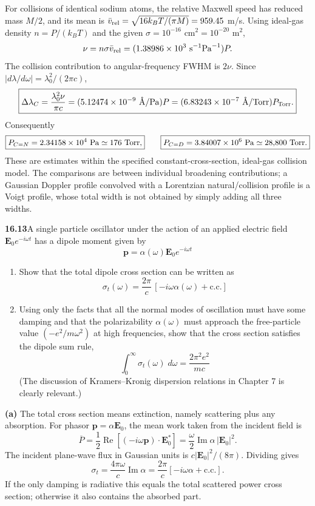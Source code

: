 For collisions of identical sodium atoms, the relative Maxwell speed
has reduced mass $M/2$, and its mean is
$\bar v_{\rm rel}=\sqrt{16k_BT/(\pi M)}=959.45$ m/s.
Using ideal-gas density $n=P/(k_BT)$ and the given
$\sigma=10^{-16}$ cm$^2=10^{-20}$ m$^2$,
\[
\nu=n\sigma\bar v_{\rm rel}
=(1.38986\times10^3\ {\rm s}^{-1}{\rm Pa}^{-1})P.
\]
The collision contribution to angular-frequency FWHM is $2\nu$.
Since $|d\lambda/d\omega|=\lambda_0^2/(2\pi c)$,
\[
\boxed{\Delta\lambda_C=\frac{\lambda_0^2\nu}{\pi c}
=(5.12474\times10^{-9}\ \text{\AA/Pa})P
=(6.83243\times10^{-7}\ \text{\AA/Torr})P_{\rm Torr}.}
\]
Consequently
\[
\boxed{P_{C=N}=2.34158\times10^4\ {\rm Pa}\simeq176\ {\rm Torr},}
\qquad
\boxed{P_{C=D}=3.84007\times10^6\ {\rm Pa}\simeq28{,}800\ {\rm Torr}.}
\]
These are estimates within the specified constant-cross-section,
ideal-gas collision model. The comparisons are between individual
broadening contributions; a Gaussian Doppler profile convolved with
a Lorentzian natural/collision profile is a Voigt profile, whose total
width is not obtained by simply adding all three widths.

\par\bigskip
\noindent\textbf{16.13}\quad A single particle oscillator under the action of an applied electric field $\mathbf{E}_{0}e^{-i\omega t}$ has a dipole moment given by
\[
\mathbf{p}=\alpha(\omega)\mathbf{E}_{0}e^{-i\omega t}
\]
\begin{enumerate}
\item[(a)] Show that the total dipole cross section can be written as
\[
\sigma_{t}(\omega)=\frac{2\pi}{c}\,[-i\omega\alpha(\omega)+\text{c.c.}]
\]
\item[(b)] Using only the facts that all the normal modes of oscillation must have some damping and that the polarizability $\alpha(\omega)$ must approach the free-particle value $(-e^{2}/m\omega^{2})$ at high frequencies, show that the cross section satisfies the dipole sum rule,
\[
\int_{0}^{\infty}\sigma_{t}(\omega)\;d\omega=\frac{2\pi^{2}e^{2}}{mc}
\]
(The discussion of Kramers--Kronig dispersion relations in Chapter 7 is clearly relevant.)
\end{enumerate}
\solution

\textbf{(a)} The total cross section means extinction, namely scattering
plus any absorption. For phasor $\mathbf p=\alpha\mathbf E_0$,
the mean work taken from the incident field is
\[
\overline P=\frac12\operatorname{Re}
[(-i\omega\mathbf p)\cdot\mathbf E_0^*]
=\frac\omega2\operatorname{Im}\alpha\,|\mathbf E_0|^2.
\]
The incident plane-wave flux in Gaussian units is
$c|\mathbf E_0|^2/(8\pi)$. Dividing gives
\[
\boxed{\sigma_t=\frac{4\pi\omega}{c}\operatorname{Im}\alpha
=\frac{2\pi}{c}[-i\omega\alpha+\text{c.c.}].}
\]
If the only damping is radiative this equals the total scattered power
cross section; otherwise it also contains the absorbed part.

